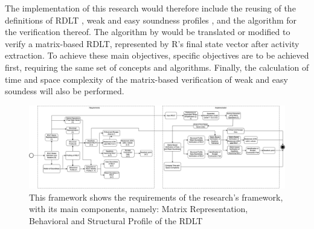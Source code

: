 The implementation of this research would therefore include the reusing of the definitions of RDLT \cite{Malinao2017}, weak and easy soundness profiles \cite{Ramirez2024}, and the algorithm for the verification thereof. The algorithm by \cite{Ramirez2024} would be translated or modified to verify a matrix-based RDLT, represented by R's final state vector after activity extraction. To achieve these main objectives, specific objectives are to be achieved first, requiring the same set of concepts and algorithms. Finally, the calculation of time and space complexity of the matrix-based verification of weak and easy soundess will also be performed. 


\begin{figure}[p]
    \centering
    \includegraphics[width=\paperwidth, angle=90]{../Figures/Conceptual Framework.png}
    \caption{This framework shows the requirements of the research's framework, with its main components, namely: Matrix Representation, Behavioral and Structural Profile of the RDLT}
\end{figure}